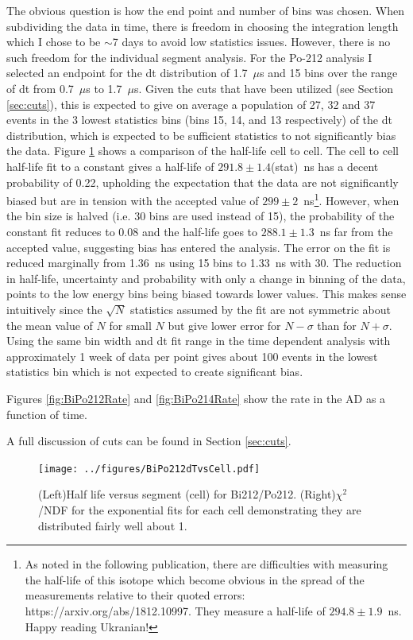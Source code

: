The obvious question is how the end point and number of bins was chosen. When subdividing the data in time, there is freedom in choosing the integration length which I chose to be $\sim$7 days to avoid low statistics issues. However, there is no such freedom for the individual segment analysis. For the Po-212 analysis I selected an endpoint for the dt distribution of 1.7~$\mu$s and 15 bins over the range of dt from 0.7~$\mu$s to 1.7~$\mu$s. Given the cuts that have been utilized (see Section \ref{sec:cuts}), this is expected to give on average a population of 27, 32 and 37 events in the 3 lowest statistics bins (bins 15, 14, and 13 respectively) of the dt distribution, which is expected to be sufficient statistics to not significantly bias the data. Figure \ref{fig:Po212thalfvscell} shows a comparison of the half-life cell to cell. The cell to cell half-life fit to a constant gives a half-life of $291.8\pm1.4$(stat)~ns has a decent probability of 0.22, upholding the expectation that the data are not significantly biased but are in tension with the accepted value of $299\pm2$~ns\footnote{As noted in the following publication, there are difficulties with measuring the half-life of this isotope which become obvious in the spread of the measurements relative to their quoted errors: https://arxiv.org/abs/1812.10997. They measure a half-life of $294.8\pm1.9$~ns. Happy reading Ukranian!}. However, when the bin size is halved (i.e. 30 bins are used instead of 15), the probability of the constant fit reduces to 0.08 and the half-life goes to $288.1\pm1.3$~ns far from the accepted value, suggesting bias has entered the analysis. The error on the fit is reduced marginally from 1.36~ns using 15 bins to 1.33~ns with 30. The reduction in half-life, uncertainty and probability with only a change in binning of the data, points to the low energy bins being biased towards lower values. This makes sense intuitively since the $\sqrt{N}$ statistics assumed by the fit are not symmetric about the mean value of $N$ for small $N$ but give lower error for $N-\sigma$ than for $N+\sigma$. Using the same bin width and dt fit range in the time dependent analysis with approximately 1 week of data per point gives about 100 events in the lowest statistics bin which is not expected to create significant bias. 

 Figures \ref{fig:BiPo212Rate} and \ref{fig:BiPo214Rate} show the rate in the AD as a function of time.

A full discussion of cuts can be found in Section \ref{sec:cuts}.
\begin{figure}[!h]
	\centering
	\texttt{[image: ../figures/BiPo212dTvsCell.pdf]}
	\caption{\label{fig:Po212thalfvscell}(Left)Half life versus segment (cell) for Bi212/Po212. (Right)$\chi^2$/NDF for the exponential fits for each cell demonstrating they are distributed fairly well about 1.}
\end{figure}

